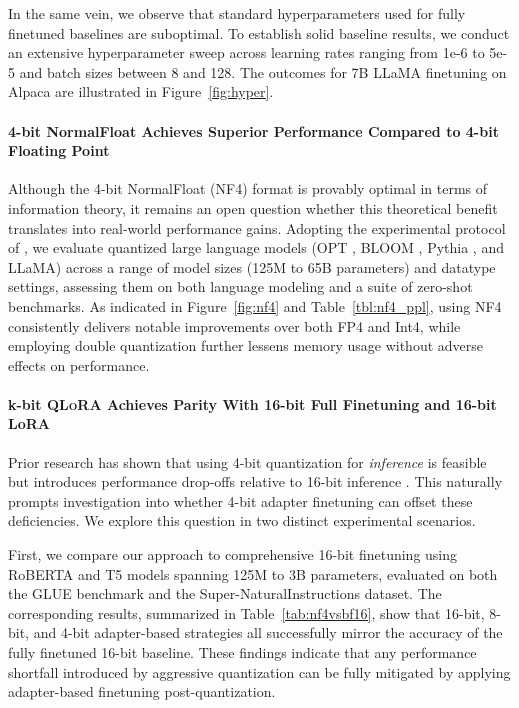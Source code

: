 In the same vein, we observe that standard hyperparameters used for fully finetuned baselines are suboptimal. To establish solid baseline results, we conduct an extensive hyperparameter sweep across learning rates ranging from 1e-6 to 5e-5 and batch sizes between 8 and 128. The outcomes for 7B LLaMA finetuning on Alpaca are illustrated in Figure~\ref{fig:hyper}.

\paragraph{4-bit NormalFloat Achieves Superior Performance Compared to 4-bit Floating Point}

Although the 4-bit NormalFloat (NF4) format is provably optimal in terms of information theory, it remains an open question whether this theoretical benefit translates into real-world performance gains. Adopting the experimental protocol of \citet{dettmers2022case}, we evaluate quantized large language models (OPT \citep{zhang2022opt}, BLOOM \cite{scao2022bloom}, Pythia \cite{biderman2023pythia}, and LLaMA) across a range of model sizes (125M to 65B parameters) and datatype settings, assessing them on both language modeling and a suite of zero-shot benchmarks. As indicated in Figure~\ref{fig:nf4} and Table~\ref{tbl:nf4_ppl}, using NF4 consistently delivers notable improvements over both FP4 and Int4, while employing double quantization further lessens memory usage without adverse effects on performance.

\paragraph{k-bit \textsc{QLoRA} Achieves Parity With 16-bit Full Finetuning and 16-bit LoRA} Prior research has shown that using 4-bit quantization for \emph{inference} is feasible but introduces performance drop-offs relative to 16-bit inference \citep{dettmers2022case,frantar2022gptq}. This naturally prompts investigation into whether 4-bit adapter finetuning can offset these deficiencies. We explore this question in two distinct experimental scenarios.

First, we compare our approach to comprehensive 16-bit finetuning using RoBERTA and T5 models spanning 125M to 3B parameters, evaluated on both the GLUE benchmark and the Super-NaturalInstructions dataset. The corresponding results, summarized in Table~\ref{tab:nf4vsbf16}, show that 16-bit, 8-bit, and 4-bit adapter-based strategies all successfully mirror the accuracy of the fully finetuned 16-bit baseline. These findings indicate that any performance shortfall introduced by aggressive quantization can be fully mitigated by applying adapter-based finetuning post-quantization.

